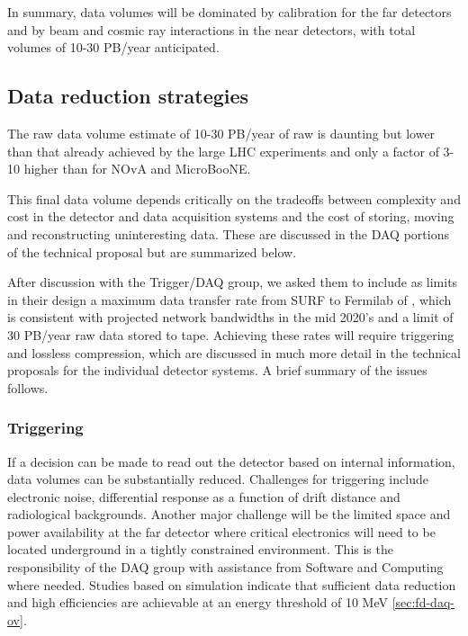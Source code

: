 In summary, data volumes will be dominated by calibration for the far detectors and by beam and cosmic ray interactions in the near detectors, with total volumes of 10-30 PB/year anticipated. 



\subsection{Data reduction strategies}

The raw data volume estimate of 10-30 PB/year of raw is daunting but lower than that already achieved by the large LHC experiments and only a factor of 3-10 higher than for NOvA and MicroBooNE. 

This final data volume depends critically on the tradeoffs between complexity and cost in the detector and data acquisition systems and the cost of storing, moving and reconstructing uninteresting data.  These are discussed in the DAQ portions of the technical proposal but are summarized below. 

After discussion with the Trigger/DAQ group, we asked them to include as limits in their design a  maximum data transfer rate from SURF to Fermilab of \surffnalbw, which is consistent with projected network bandwidths in the mid 2020's and a limit of 30 PB/year raw data stored to tape.  Achieving these rates will require triggering and lossless compression, which are discussed in much more detail in the technical proposals for the individual detector systems.  A brief summary of the issues follows.  

\subsubsection{Triggering}

If a decision can be made to read  out the detector based on internal information, data volumes can be substantially reduced.  
Challenges for triggering include electronic noise, differential response as a function of drift distance and radiological backgrounds.
Another major challenge will be the limited space and power availability at the far detector where critical electronics will need to be located underground in a tightly constrained environment.  This is the responsibility of the DAQ group with assistance from Software and Computing where needed. Studies based on simulation indicate that  sufficient data reduction and high efficiencies are achievable at an energy threshold of 10 MeV \ref{sec:fd-daq-ov}.  


